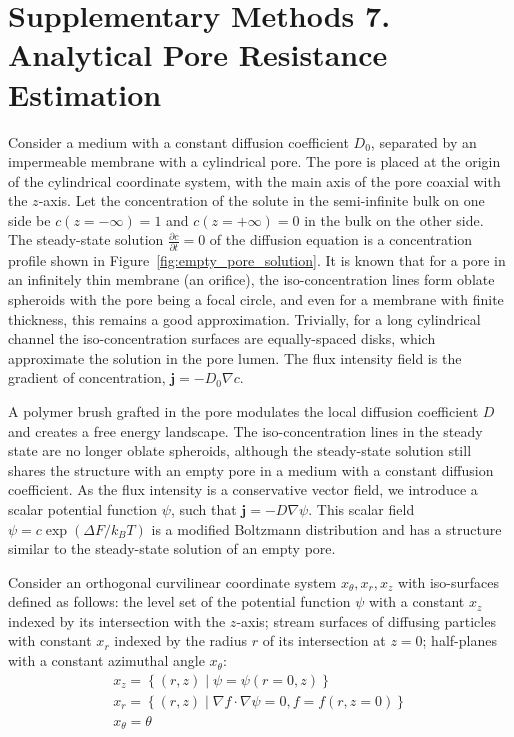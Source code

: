 \documentclass[10pt, a4paper]{article}
\begin{document}
\section{Supplementary Methods 7. Analytical Pore Resistance Estimation}
\begin{multicols}{2}



Consider a medium with a constant diffusion coefficient $D_0$, separated by an impermeable membrane with a cylindrical pore.
The pore is placed at the origin of the cylindrical coordinate system, with the main axis of the pore coaxial with the $z$-axis.
Let the concentration of the solute in the semi-infinite bulk on one side be $c(z = -\infty) = 1$ and $c(z = +\infty) = 0$ in the bulk on the other side.
The steady-state solution $\frac{\partial c}{\partial t} = 0$ of the diffusion equation is a concentration profile shown in Figure~\ref{fig:empty_pore_solution}.
It is known that for a pore in an infinitely thin membrane (an orifice), the iso-concentration lines form oblate spheroids with the pore being a focal circle, and even for a membrane with finite thickness, this remains a good approximation.
Trivially, for a long cylindrical channel the iso-concentration surfaces are equally-spaced disks, which approximate the solution in the pore lumen.
The flux intensity field is the gradient of concentration, $\bm{j} = -D_0 \nabla c$.

A polymer brush grafted in the pore modulates the local diffusion coefficient $D$ and creates a free energy landscape.
The iso-concentration lines in the steady state are no longer oblate spheroids, although the steady-state solution still shares the structure with an empty pore in a medium with a constant diffusion coefficient.
As the flux intensity is a conservative vector field, we introduce a scalar potential function $\psi$, such that $\bm{j} = -D \nabla \psi$.
This scalar field $\psi = c \exp(\Delta F / k_B T)$ is a modified Boltzmann distribution and has a structure similar to the steady-state solution of an empty pore.

Consider an orthogonal curvilinear coordinate system $x_{\theta}, x_{r}, x_{z}$ with iso-surfaces defined as follows:
the level set of the potential function $\psi$ with a constant $x_{z}$ indexed by its intersection with the $z$-axis;
stream surfaces of diffusing particles with constant $x_{r}$ indexed by the radius $r$ of its intersection at $z = 0$;
half-planes with a constant azimuthal angle $x_{\theta}$:
\begin{gather}
    x_z = \left\{ (r, z) \mid \psi = \psi(r = 0, z) \right\}
    \\
    x_r = \left\{ (r, z) \mid \nabla f \cdot \nabla \psi = 0, f = f(r, z = 0) \right\}
    \\
    x_{\theta} = \theta
\end{gather}


\end{multicols}
\end{document}
